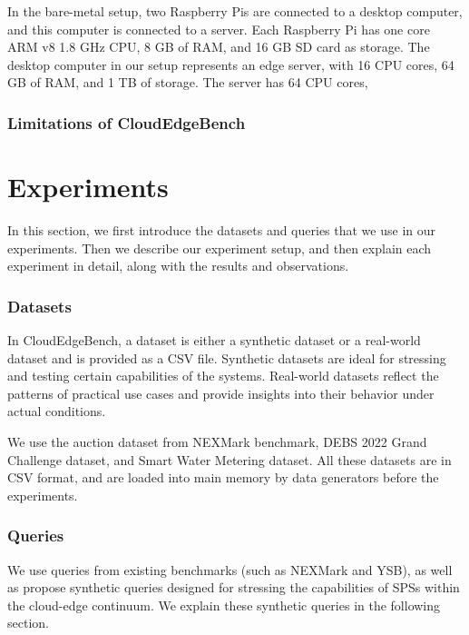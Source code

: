 \documentclass[runningheads]{llncs}
\begin{document}
In the bare-metal setup, two Raspberry Pis are connected to a desktop computer, and this computer is connected to a server.
Each Raspberry Pi has one core ARM v8 1.8 GHz CPU, 8 GB of RAM, and 16 GB SD card as storage.
The desktop computer in our setup represents an edge server, with 16 CPU cores, 64 GB of RAM, and 1 TB of storage.
The server has 64 CPU cores,

\subsubsection{Limitations of CloudEdgeBench}

\section{Experiments} \label{sec:experiments}
In this section, we first introduce the datasets and queries that we use in our experiments.
Then we describe our experiment setup, and then explain each experiment in detail, along with the results and observations.




\subsubsection{Datasets}

In CloudEdgeBench, a dataset is either a synthetic dataset or a real-world dataset and is provided as a CSV file.
Synthetic datasets are ideal for stressing and testing certain capabilities of the systems.
Real-world datasets reflect the patterns of practical use cases and provide insights into their behavior under actual conditions.

We use the auction dataset from NEXMark benchmark\cite{nexmark}, DEBS 2022 Grand Challenge dataset\cite{debs-dataset}, and Smart Water Metering dataset\cite{use-case-2}.
All these datasets are in CSV format, and are loaded into main memory by data generators before the experiments.

\subsubsection{Queries}\label{queries}
We use queries from existing benchmarks (such as NEXMark\cite{nexmark} and YSB\cite{yahoo-bench}), as well as propose synthetic queries designed for stressing the capabilities of SPSs within the cloud-edge continuum.
We explain these synthetic queries in the following section.
\end{document}

